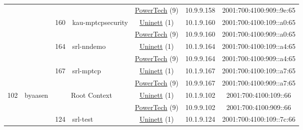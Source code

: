 \begin{small}
\begin{center}
\begin{longtable}{|c|c|c|c|c|c|c|c|}
  &  &  &  & \multicolumn{2}{|c|}{\tiny{\href{http://www.powertech.no}{PowerTech} (9)}} & \tiny{10.9.9.158} & \tiny{2001:700:4100:909::9e:65} \\* \cline{3-3}\cline{4-4}\cline{5-5}\cline{6-6}\cline{7-7}\cline{8-8}
  &  & \multirow{2}{*}{\tiny{160}} & \multicolumn{1}{|l|}{\multirow{2}{*}{\tiny{kau-mptcpsecurity}}} & \multicolumn{2}{|c|}{\tiny{\href{https://www.uninett.no}{Uninett} (1)}} & \tiny{10.1.9.160} & \tiny{2001:700:4100:109::a0:65} \\* \cline{5-5}\cline{6-6}\cline{7-7}\cline{8-8}
  &  &  &  & \multicolumn{2}{|c|}{\tiny{\href{http://www.powertech.no}{PowerTech} (9)}} & \tiny{10.9.9.160} & \tiny{2001:700:4100:909::a0:65} \\* \cline{3-3}\cline{4-4}\cline{5-5}\cline{6-6}\cline{7-7}\cline{8-8}
  &  & \multirow{2}{*}{\tiny{164}} & \multicolumn{1}{|l|}{\multirow{2}{*}{\tiny{srl-nndemo}}} & \multicolumn{2}{|c|}{\tiny{\href{https://www.uninett.no}{Uninett} (1)}} & \tiny{10.1.9.164} & \tiny{2001:700:4100:109::a4:65} \\* \cline{5-5}\cline{6-6}\cline{7-7}\cline{8-8}
  &  &  &  & \multicolumn{2}{|c|}{\tiny{\href{http://www.powertech.no}{PowerTech} (9)}} & \tiny{10.9.9.164} & \tiny{2001:700:4100:909::a4:65} \\* \cline{3-3}\cline{4-4}\cline{5-5}\cline{6-6}\cline{7-7}\cline{8-8}
  &  & \multirow{2}{*}{\tiny{167}} & \multicolumn{1}{|l|}{\multirow{2}{*}{\tiny{srl-mptcp}}} & \multicolumn{2}{|c|}{\tiny{\href{https://www.uninett.no}{Uninett} (1)}} & \tiny{10.1.9.167} & \tiny{2001:700:4100:109::a7:65} \\* \cline{5-5}\cline{6-6}\cline{7-7}\cline{8-8}
  &  &  &  & \multicolumn{2}{|c|}{\tiny{\href{http://www.powertech.no}{PowerTech} (9)}} & \tiny{10.9.9.167} & \tiny{2001:700:4100:909::a7:65} \\ \hline
 \multirow{14}{*}{\tiny{102}} & \multicolumn{1}{|l|}{\multirow{14}{*}{\tiny{byaasen}}} & \multicolumn{2}{|c|}{\multirow{2}{*}{\tiny{Root Context}}} & \multicolumn{2}{|c|}{\tiny{\href{https://www.uninett.no}{Uninett} (1)}} & \tiny{10.1.9.102} & \tiny{2001:700:4100:109::66} \\* \cline{5-5}\cline{6-6}\cline{7-7}\cline{8-8}
  &  & \multicolumn{2}{|c|}{} & \multicolumn{2}{|c|}{\tiny{\href{http://www.powertech.no}{PowerTech} (9)}} & \tiny{10.9.9.102} & \tiny{2001:700:4100:909::66} \\* \cline{3-3}\cline{4-4}\cline{5-5}\cline{6-6}\cline{7-7}\cline{8-8}
  &  & \multirow{2}{*}{\tiny{124}} & \multicolumn{1}{|l|}{\multirow{2}{*}{\tiny{srl-test}}} & \multicolumn{2}{|c|}{\tiny{\href{https://www.uninett.no}{Uninett} (1)}} & \tiny{10.1.9.124} & \tiny{2001:700:4100:109::7c:66} \\* \cline{5-5}\cline{6-6}\cline{7-7}\cline{8-8}

\end{longtable}
\end{center}
\end{small}
